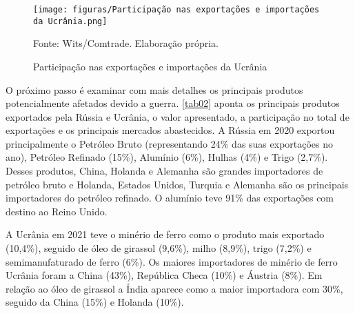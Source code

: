 \documentclass[
article, %
12pt, %
oneside, %
a4paper, %
portuguese, %
portuguese %
]{abntex2}
\begin{document}
\begin{figure}[H]
    \centering
    \caption{Participação nas exportações e importações da Ucrânia}
    \texttt{[image: figuras/Participação nas exportações e importações da Ucrânia.png]}
    \begin{flushleft}
    Fonte: Wits/Comtrade. Elaboração própria.
    \end{flushleft}
    \label{fig:02}
\end{figure}

O próximo passo é examinar com mais detalhes os principais produtos potencialmente afetados devido a guerra. \autoref{tab02} aponta os principais produtos exportados pela Rússia e Ucrânia, o valor apresentado, a participação no total de exportações e os principais mercados abastecidos. A Rússia em 2020 exportou principalmente o Petróleo Bruto (representando 24\% das suas exportações no ano), Petróleo Refinado (15\%), Alumínio (6\%), Hulhas (4\%) e Trigo (2,7\%). Desses produtos, China, Holanda e Alemanha são grandes importadores de petróleo bruto e Holanda, Estados Unidos, Turquia e Alemanha são os principais importadores do petróleo refinado. O alumínio teve 91\% das exportações com destino ao Reino Unido.

A Ucrânia em 2021 teve o minério de ferro como o produto mais exportado (10,4\%), seguido de óleo de girassol (9,6\%), milho (8,9\%), trigo (7,2\%) e semimanufaturado de ferro (6\%). Os maiores importadores de minério de ferro Ucrânia foram a China (43\%), República Checa (10\%) e Áustria (8\%). Em relação ao óleo de girassol a Índia aparece como a maior importadora com 30\%, seguido da China (15\%) e Holanda (10\%).
\end{document}
